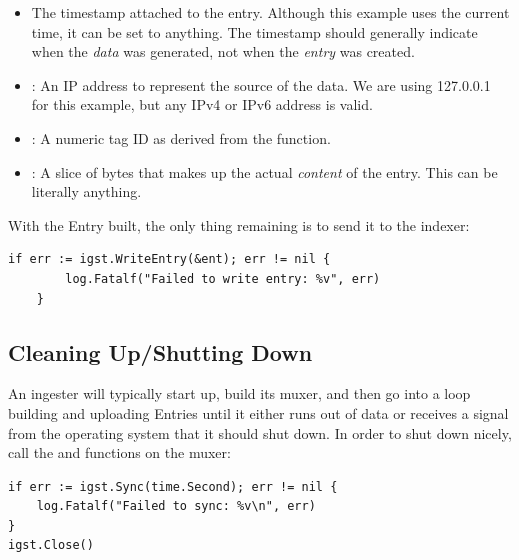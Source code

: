 \begin{itemize}
\item
   The timestamp attached to the entry. Although this example uses
  the current time, it can be set to anything. The timestamp should generally indicate when
  the \emph{data} was generated, not when the \emph{entry} was created.
\item
  : An IP address to represent the source of the data. We are using
  127.0.0.1 for this example, but any IPv4 or IPv6 address is valid.
\item
  : A numeric tag ID as derived from the  function.
\item
  : A slice of bytes that makes up the actual \emph{content} of the
  entry. This can be literally anything.
\end{itemize}

With the Entry built, the only thing remaining is to send it to the
indexer:

\begin{Verbatim}[breaklines=true]
    if err := igst.WriteEntry(&ent); err != nil {
        log.Fatalf("Failed to write entry: %v", err)
    }
\end{Verbatim}

\subsection{Cleaning Up/Shutting Down}

An ingester will typically start up, build its muxer, and then go into
a loop building and uploading Entries until it either runs out of data
or receives a signal from the operating system that it should shut down.
In order to shut down nicely, call the  and  functions on the
muxer:

\begin{Verbatim}[breaklines=true]
if err := igst.Sync(time.Second); err != nil {
    log.Fatalf("Failed to sync: %v\n", err)
}
igst.Close()
\end{Verbatim}



